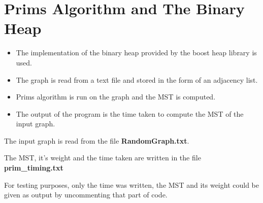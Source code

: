 \documentclass[]{article}
\begin{document}
\section{Prims Algorithm and The Binary Heap}
\begin{flushleft}
\begin{itemize}


	\item The implementation of the binary heap provided by the boost heap library is used.
	\item The graph is read from a text file and stored in the form of an adjacency list. 
	\item Prims algorithm is run on the graph and the MST is computed.
	\item The output of the program is the time taken to compute the MST of the input graph.
\end{itemize}	
		\vspace{10px}
	The input graph is read from the file \textbf{RandomGraph.txt}.
	
	The MST, it's weight and the time taken are written in the file \textbf{prim\_timing.txt}
	
	For testing purposes, only the time was written, the MST and its weight could be given as output by uncommenting that part of code.  
	
  
\end{flushleft} 
\end{document}
